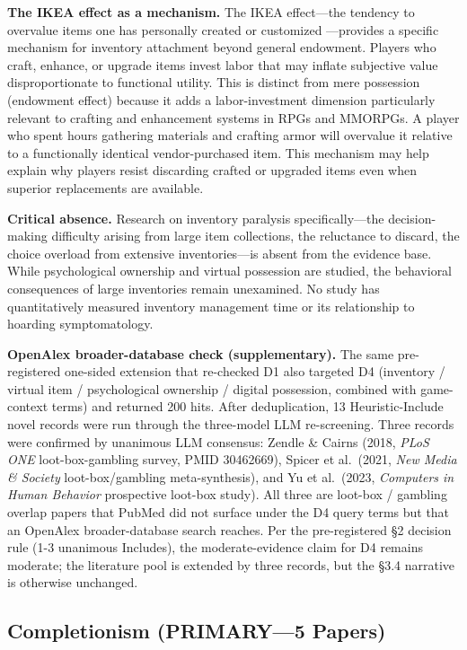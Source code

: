 \documentclass[12pt]{article}
\begin{document}
\textbf{The IKEA effect as a mechanism.} The IKEA effect---the tendency to overvalue items one has personally created or customized \citep{Norton2012}---provides a specific mechanism for inventory attachment beyond general endowment. Players who craft, enhance, or upgrade items invest labor that may inflate subjective value disproportionate to functional utility. This is distinct from mere possession (endowment effect) because it adds a labor-investment dimension particularly relevant to crafting and enhancement systems in RPGs and MMORPGs. A player who spent hours gathering materials and crafting armor will overvalue it relative to a functionally identical vendor-purchased item. This mechanism may help explain why players resist discarding crafted or upgraded items even when superior replacements are available.

\textbf{Critical absence.} Research on inventory paralysis specifically---the decision-making difficulty arising from large item collections, the reluctance to discard, the choice overload from extensive inventories---is absent from the evidence base. While psychological ownership and virtual possession are studied, the behavioral consequences of large inventories remain unexamined. No study has quantitatively measured inventory management time or its relationship to hoarding symptomatology.

\textbf{OpenAlex broader-database check (supplementary).} The same pre-registered one-sided extension that re-checked D1 also targeted D4 (inventory / virtual item / psychological ownership / digital possession, combined with game-context terms) and returned 200 hits. After deduplication, 13 Heuristic-Include novel records were run through the three-model LLM re-screening. Three records were confirmed by unanimous LLM consensus: Zendle \& Cairns (2018, \textit{PLoS ONE} loot-box-gambling survey, PMID 30462669), Spicer et al.\ (2021, \textit{New Media \& Society} loot-box/gambling meta-synthesis), and Yu et al.\ (2023, \textit{Computers in Human Behavior} prospective loot-box study). All three are loot-box / gambling overlap papers that PubMed did not surface under the D4 query terms but that an OpenAlex broader-database search reaches. Per the pre-registered §2 decision rule (1-3 unanimous Includes), the moderate-evidence claim for D4 remains moderate; the literature pool is extended by three records, but the §3.4 narrative is otherwise unchanged.

\subsection{Completionism (PRIMARY---5 Papers)}
\end{document}
